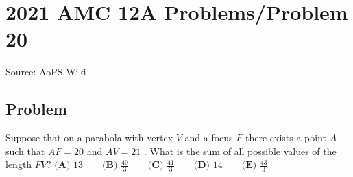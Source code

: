 \documentclass[12pt]{article}
\begin{document}
\section*{{2021 AMC 12A Problems/Problem 20}}
Source: AoPS Wiki

\subsection*{Problem}
Suppose that on a parabola with vertex $V$ and a focus $F$ there exists a point $A$ such that $AF=20$ and $AV=21$ . What is the sum of all possible values of the length $FV?$ $\textbf{(A) }13 \qquad \textbf{(B) }\frac{40}3 \qquad \textbf{(C) }\frac{41}3 \qquad \textbf{(D) }14\qquad \textbf{(E) }\frac{43}3$
\end{document}
